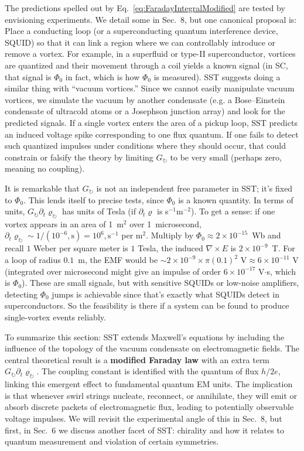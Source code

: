 \documentclass[10pt,reprint,aps,onecolumn,nofootinbib]{revtex4-2}
\begin{document}
The predictions spelled out by Eq.~\eqref{eq:FaradayIntegralModified} are tested by envisioning experiments. We detail some in Sec.~8, but one canonical proposal is: Place a conducting loop (or a superconducting quantum interference device, SQUID) so that it can link a region where we can controllably introduce or remove a vortex. For example, in a superfluid or type-II superconductor, vortices are quantized and their movement through a coil yields a known signal (in SC, that signal is $\Phi_0$ in fact, which is how $\Phi_0$ is measured). SST suggests doing a similar thing with ``vacuum vortices.'' Since we cannot easily manipulate vacuum vortices, we simulate the vacuum by another condensate (e.g. a Bose–Einstein condensate of ultracold atoms or a Josephson junction array) and look for the predicted signals. If a single vortex enters the area of a pickup loop, SST predicts an induced voltage spike corresponding to one flux quantum. If one fails to detect such quantized impulses under conditions where they should occur, that could constrain or falsify the theory by limiting $G_{\circlearrowright}$ to be very small (perhaps zero, meaning no coupling).


It is remarkable that $G_{\circlearrowright}$ is not an independent free parameter in SST; it’s fixed to $\Phi_0$. This lends itself to precise tests, since $\Phi_0$ is a known quantity. In terms of units, $G_{\circlearrowright}\partial_t \varrho_{\circlearrowright}$ has units of Tesla (if $\partial_t \varrho$ is s$^{-1}$m$^{-2}$). To get a sense: if one vortex appears in an area of 1~m$^2$ over 1~microsecond, $\partial_t \varrho_{\circlearrowright} \sim 1/(10^{-6},\text{s}) = 10^6 ,\text{s}^{-1}$ per m$^2$. Multiply by $\Phi_0 \approx 2\times10^{-15}$~Wb and recall $1$ Weber per square meter is $1$ Tesla, the induced $\nabla\times E$ is $2\times10^{-9}$~T. For a loop of radius $0.1$~m, the EMF would be $\sim 2\times10^{-9} \times \pi(0.1)^2$ V$\approx 6\times10^{-11}$ V (integrated over microsecond might give an impulse of order $6\times10^{-17}$ V$\cdot$s, which is $\Phi_0$). These are small signals, but with sensitive SQUIDs or low-noise amplifiers, detecting $\Phi_0$ jumps is achievable since that's exactly what SQUIDs detect in superconductors. So the feasibility is there if a system can be found to produce single-vortex events reliably.


To summarize this section: SST extends Maxwell’s equations by including the influence of the topology of the vacuum condensate on electromagnetic fields. The central theoretical result is a \textbf{modified Faraday law} with an extra term $G_{\circlearrowright} \partial_t \varrho_{\circlearrowright}$. The coupling constant is identified with the quantum of flux $h/2e$, linking this emergent effect to fundamental quantum EM units. The implication is that whenever swirl strings nucleate, reconnect, or annihilate, they will emit or absorb discrete packets of electromagnetic flux, leading to potentially observable voltage impulses. We will revisit the experimental angle of this in Sec.~8, but first, in Sec.~6 we discuss another facet of SST: chirality and how it relates to quantum measurement and violation of certain symmetries.
\end{document}
